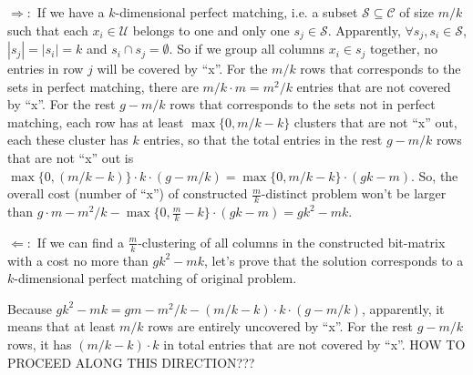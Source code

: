 \begin{IEEEproof}
$\Longrightarrow : $ If we have a $k$-dimensional perfect matching, i.e.
a subset $\mathcal{S} \subseteq \mathcal{C}$ of size $m/k$ such that each
$x_i \in \mathcal{U}$ belongs to one and only one $s_j \in \mathcal{S}$.
Apparently, $\forall s_j, s_i \in \mathcal{S}$, $|s_j| = |s_i| = k$
and $s_i \cap s_j = \emptyset$. So if we group all columns $x_i \in s_j$
together, no entries in row $j$ will be covered by ``x''. For the $m/k$
rows that corresponds to the sets in perfect matching, there
are $m/k \cdot m = m^2/k$ entries that are not covered by ``x''. For
the rest $g - m/k$ rows that corresponds to the sets not in perfect
matching, each row has at least $\max\{0, m/k - k\}$ clusters that are not
``x'' out, each these cluster has $k$ entries, so that the total entries
in the rest $g - m/k$ rows that are not ``x'' out is $\max\{0, (m/k -
k)\} \cdot k \cdot (g - m/k) = \max\{0, m/k - k\} \cdot (gk - m)$.  So,
the overall cost (number of ``x'') of constructed $\frac{m}{k}$-distinct
problem won't be larger than $g \cdot m - m^2/k - \max\{0, \frac{m}{k}
- k\} \cdot (g k - m) = gk^2 - mk$.

$\Longleftarrow : $ If we can find a $\frac{m}{k}$-clustering of all
columns in the constructed bit-matrix with a cost no more than $gk^2 -
mk$, let's prove that the solution corresponds to a $k$-dimensional
perfect matching of original problem.

Because $gk^2 - mk = gm - m^2/k - (m/k - k) \cdot k \cdot (g - m/k)$,
apparently, it means that at least $m/k$ rows are entirely uncovered 
by ``x''. For the rest $g - m/k$ rows, it has $(m/k - k) \cdot k$ in 
total entries that are not covered by ``x''.
HOW TO PROCEED ALONG THIS DIRECTION???
\end{IEEEproof}
